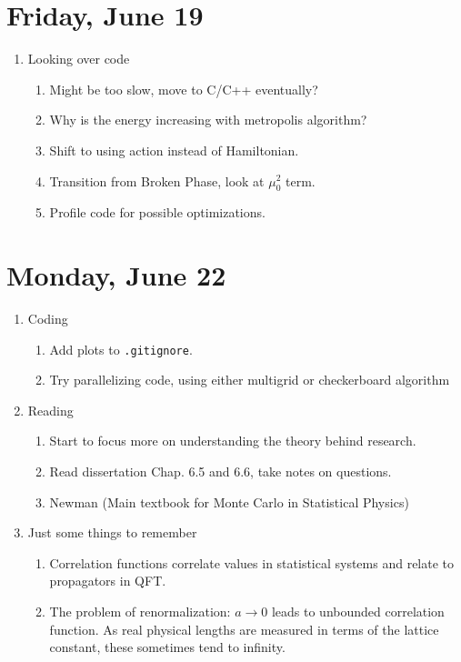 \documentclass[english]{article}
\begin{document}
\section{Friday, June 19}
    \begin{enumerate}
        \item Looking over code
        \begin{enumerate}
            \item Might be too slow, move to C/C++ eventually?
            \item Why is the energy increasing with metropolis algorithm?
            \item Shift to using action instead of Hamiltonian.
            \item Transition from Broken Phase, look at $\mu_0^2$ term.
            \item Profile code for possible optimizations. %
        \end{enumerate}
    \end{enumerate}

 \section{Monday, June 22}
    \begin{enumerate}
        \item Coding
        \begin{enumerate}
            \item Add plots to \texttt{.gitignore}.
            \item Try parallelizing code, using either multigrid or checkerboard algorithm
        \end{enumerate}

        \item Reading
        \begin{enumerate}
            \item Start to focus more on understanding the theory behind research.
            \item Read dissertation \cite{Schaich2006} Chap. 6.5 and 6.6, take notes on questions.
            \item Newman \cite{Newman1999} (Main textbook for Monte Carlo in Statistical Physics)
        \end{enumerate}

        \item Just some things to remember
        \begin{enumerate}
            \item Correlation functions correlate values in statistical systems and relate to propagators in QFT.
            \item The problem of renormalization: $a\rightarrow0$ leads to unbounded correlation function. As real physical lengths are measured in terms of the lattice constant, these sometimes tend to infinity.
        \end{enumerate}
    \end{enumerate}
\end{document}
